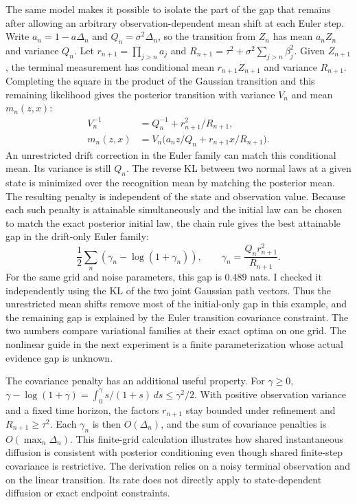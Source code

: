 \documentclass[12pt]{article}
\begin{document}
The same model makes it possible to isolate the part of the gap that remains after allowing an arbitrary observation-dependent mean shift at each Euler step. Write \(a_n=1-a\Delta_n\) and \(Q_n=\sigma^2\Delta_n\), so the transition from \(Z_n\) has mean \(a_n Z_n\) and variance \(Q_n\). Let \(r_{n+1}=\prod_{j>n}a_j\) and \(R_{n+1}=\tau^2+\sigma^2\sum_{j>n}\beta_j^2\). Given \(Z_{n+1}\), the terminal measurement has conditional mean \(r_{n+1}Z_{n+1}\) and variance \(R_{n+1}\). Completing the square in the product of the Gaussian transition and this remaining likelihood gives the posterior transition with variance \(V_n\) and mean \(m_n(z,x)\):
\[
\begin{aligned}
 V_n^{-1} &= Q_n^{-1}+r_{n+1}^2/R_{n+1},\\
 m_n(z,x) &= V_n\bigl(a_n z/Q_n+r_{n+1}x/R_{n+1}\bigr).
\end{aligned}
\]
An unrestricted drift correction in the Euler family can match this conditional mean. Its variance is still \(Q_n\). The reverse KL between two normal laws at a given state is minimized over the recognition mean by matching the posterior mean. The resulting penalty is independent of the state and observation value. Because each such penalty is attainable simultaneously and the initial law can be chosen to match the exact posterior initial law, the chain rule gives the best attainable gap in the drift-only Euler family:
\[
 \frac12\sum_n\left(\gamma_n-\log(1+\gamma_n)\right),
 \qquad \gamma_n=\frac{Q_n r_{n+1}^2}{R_{n+1}} .
\]
For the same grid and noise parameters, this gap is \(0.489\) nats. I checked it independently using the KL of the two joint Gaussian path vectors. Thus the unrestricted mean shifts remove most of the initial-only gap in this example, and the remaining gap is explained by the Euler transition covariance constraint. The two numbers compare variational families at their exact optima on one grid. The nonlinear guide in the next experiment is a finite parameterization whose actual evidence gap is unknown.

The covariance penalty has an additional useful property. For \(\gamma\geq 0\), \(\gamma-\log(1+\gamma)=\int_0^\gamma s/(1+s)\,ds\leq\gamma^2/2\). With positive observation variance and a fixed time horizon, the factors \(r_{n+1}\) stay bounded under refinement and \(R_{n+1}\geq\tau^2\). Each \(\gamma_n\) is then \(O(\Delta_n)\), and the sum of covariance penalties is \(O(\max_n\Delta_n)\). This finite-grid calculation illustrates how shared instantaneous diffusion is consistent with posterior conditioning even though shared finite-step covariance is restrictive. The derivation relies on a noisy terminal observation and on the linear transition. Its rate does not directly apply to state-dependent diffusion or exact endpoint constraints.
\end{document}
